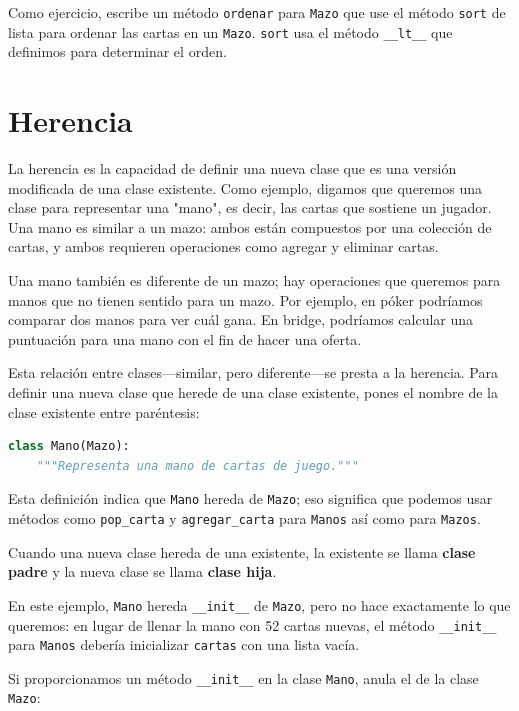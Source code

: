 Como ejercicio, escribe un método \texttt{ordenar} para \texttt{Mazo} que use el método \texttt{sort} de lista para ordenar las cartas en un \texttt{Mazo}. \texttt{sort} usa el método \texttt{\_\_lt\_\_} que definimos para determinar el orden.

\section{Herencia}

La herencia es la capacidad de definir una nueva clase que es una versión modificada de una clase existente. Como ejemplo, digamos que queremos una clase para representar una "mano", es decir, las cartas que sostiene un jugador. Una mano es similar a un mazo: ambos están compuestos por una colección de cartas, y ambos requieren operaciones como agregar y eliminar cartas.

Una mano también es diferente de un mazo; hay operaciones que queremos para manos que no tienen sentido para un mazo. Por ejemplo, en póker podríamos comparar dos manos para ver cuál gana. En bridge, podríamos calcular una puntuación para una mano con el fin de hacer una oferta.

Esta relación entre clases—similar, pero diferente—se presta a la herencia. Para definir una nueva clase que herede de una clase existente, pones el nombre de la clase existente entre paréntesis:

\begin{lstlisting}[language=Python]
class Mano(Mazo):
    """Representa una mano de cartas de juego."""
\end{lstlisting}

Esta definición indica que \texttt{Mano} hereda de \texttt{Mazo}; eso significa que podemos usar métodos como \texttt{pop\_carta} y \texttt{agregar\_carta} para \texttt{Manos} así como para \texttt{Mazos}.

Cuando una nueva clase hereda de una existente, la existente se llama \textbf{clase padre} y la nueva clase se llama \textbf{clase hija}.

En este ejemplo, \texttt{Mano} hereda \texttt{\_\_init\_\_} de \texttt{Mazo}, pero no hace exactamente lo que queremos: en lugar de llenar la mano con 52 cartas nuevas, el método \texttt{\_\_init\_\_} para \texttt{Manos} debería inicializar \texttt{cartas} con una lista vacía.

Si proporcionamos un método \texttt{\_\_init\_\_} en la clase \texttt{Mano}, anula el de la clase \texttt{Mazo}:

